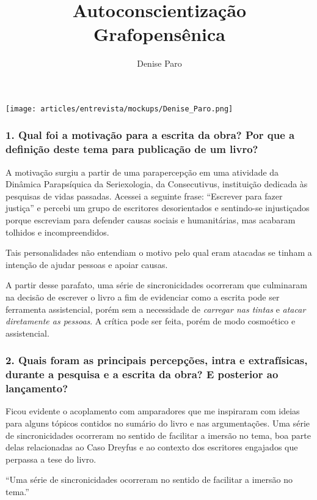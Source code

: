 \documentclass{gescons}
\author{Denise Paro}
\title{Autoconscientização Grafopensênica}
\begin{document}
    \makeentrevistatitle

    \begin{multicols}{2}

\begin{center}
    \texttt{[image: articles/entrevista/mockups/Denise\_Paro.png]}
\end{center}

\subsubsection{1. Qual foi a motivação para a escrita da obra? Por que a definição deste tema para publicação de um livro?}

A motivação surgiu a partir de uma parapercepção em uma atividade da
Dinâmica Parapsíquica da Seriexologia, da Consecutivus, instituição
dedicada às pesquisas de vidas passadas. Acessei a seguinte frase:
``Escrever para fazer justiça'' e percebi um grupo de escritores
desorientados e sentindo-se injustiçados porque escreviam para defender
causas sociais e humanitárias, mas acabaram tolhidos e incompreendidos.

Tais personalidades não entendiam o motivo pelo qual eram atacadas se
tinham a intenção de ajudar pessoas e apoiar causas.

A partir desse parafato, uma série de sincronicidades ocorreram que
culminaram na decisão de escrever o livro a fim de evidenciar como a
escrita pode ser ferramenta assistencial, porém sem a necessidade de
\emph{carregar nas tintas} e \emph{atacar diretamente as pessoas}. A
crítica pode ser feita, porém de modo cosmoético e assistencial.

\subsubsection{2. Quais foram as principais percepções, intra e extrafísicas, durante a pesquisa e a escrita da obra? E posterior ao lançamento?}

Ficou evidente o acoplamento com amparadores que me inspiraram com
ideias para alguns tópicos contidos no sumário do livro e nas
argumentações. Uma série de sincronicidades ocorreram no sentido de
facilitar a imersão no tema, boa parte delas relacionadas ao Caso
Dreyfus e ao contexto dos escritores engajados que perpassa a tese do
livro.

\begin{pullquote}
``Uma série de sincronicidades ocorreram no sentido de facilitar a imersão no tema.''
\end{pullquote}


\end{multicols}
\end{document}
